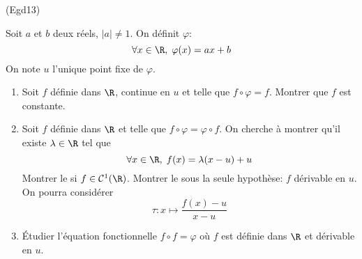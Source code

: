 \begin{tiny}(Egd13)\end{tiny} Soit $a$ et $b$ deux réels, $|a|\neq 1$. On définit $\varphi$:
\begin{displaymath}
  \forall x\in \R,\;\varphi(x) = ax +b
\end{displaymath}
On note $u$ l'unique point fixe de $\varphi$.
\begin{enumerate}
  \item Soit $f$ définie dans $\R$, continue en $u$ et telle que $f\circ \varphi =f$. Montrer que $f$ est constante.
  \item Soit $f$ définie dans $\R$ et telle que $f\circ \varphi = \varphi \circ f$. On cherche à montrer qu'il existe $\lambda\in \R$ tel que
\begin{displaymath}
  \forall x\in \R, \; f(x) = \lambda(x-u) +u
\end{displaymath}
Montrer le si $f\in \mathcal{C}^1(\R)$. Montrer le sous la seule hypothèse: $f$ dérivable en $u$. On pourra considérer
\begin{displaymath}
  \tau: x \mapsto \frac{f(x) -u}{x-u}
\end{displaymath}
\item \'Etudier l'équation fonctionnelle $f\circ f = \varphi$ où $f$ est définie dans $\R$ et dérivable en $u$.
\end{enumerate}
